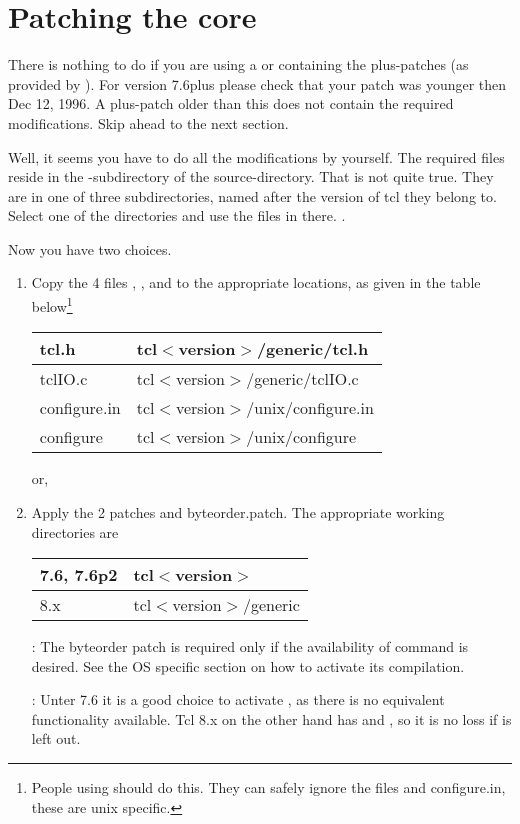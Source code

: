 \documentclass {report}
\begin{document}
\chapter  {Patching the core}\label {scalpel}

There is nothing to do if you are using a \tclsh{} or \wish{}
containing the plus-patches (as provided by \jan). For version 7.6plus
please check that your patch was younger then Dec 12, 1996. A
plus-patch older than this does not contain the required
modifications. Skip ahead to the next section.


Well, it seems you have to do all the modifications by yourself. The
required files reside in the -subdirectory of the
source-directory. That is not quite true. They are in one of three
subdirectories, named after the version of tcl they belong to. Select
one of the directories and use the files in there. .

Now you have two choices.

\begin {enumerate}
\item	Copy the 4 files , , 
	and  to the appropriate locations, as given
	in the table below\footnote {People using \win{} should do
	this. They can safely ignore the files  and \file
	{configure.in}, these are unix specific.} 

	\begin {tabular} {|l|l|} \hline
	tcl.h		& tcl$<$version$>$/generic/tcl.h	\\ \hline
	tclIO.c		& tcl$<$version$>$/generic/tclIO.c	\\ \hline
	configure.in	& tcl$<$version$>$/unix/configure.in	\\ \hline
	configure	& tcl$<$version$>$/unix/configure	\\ \hline
	\end {tabular}

	or,

\item	Apply the 2 patches  and \file
	{byteorder.patch}. The appropriate working directories are

	\begin {tabular} {|l|l|} \hline
	7.6, 7.6p2	& tcl$<$version$>$		\\ \hline
	8.x		& tcl$<$version$>$/generic	\\ \hline
	\end {tabular}

	: The byteorder patch is required only if the
	availability of command  is desired. See the OS
	specific section on how to activate its compilation.

	: Unter 7.6 it is a good choice to
	activate , as there is no equivalent functionality
	available. Tcl 8.x on the other hand has  and
	, so it is no loss if  is left out.

\end   {enumerate}
\end{document}
